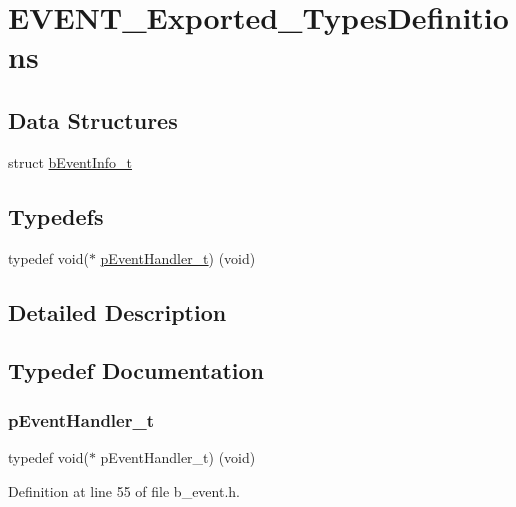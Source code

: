 \hypertarget{group___e_v_e_n_t___exported___types_definitions}{}\section{E\+V\+E\+N\+T\+\_\+\+Exported\+\_\+\+Types\+Definitions}
\label{group___e_v_e_n_t___exported___types_definitions}
\subsection*{Data Structures}
\begin{DoxyCompactItemize}
\item 
struct \mbox{\hyperlink{structb_event_info__t}{b\+Event\+Info\+\_\+t}}
\end{DoxyCompactItemize}
\subsection*{Typedefs}
\begin{DoxyCompactItemize}
\item 
typedef void($\ast$ \mbox{\hyperlink{group___e_v_e_n_t___exported___types_definitions_ga42b0d7ce13d1e439f8fe00eec38e90d1}{p\+Event\+Handler\+\_\+t}}) (void)
\end{DoxyCompactItemize}


\subsection{Detailed Description}


\subsection{Typedef Documentation}
\mbox{\label{group___e_v_e_n_t___exported___types_definitions_ga42b0d7ce13d1e439f8fe00eec38e90d1}} 
\subsubsection{\texorpdfstring{p\+Event\+Handler\+\_\+t}{pEventHandler\_t}}
{\footnotesize\ttfamily typedef void($\ast$ p\+Event\+Handler\+\_\+t) (void)}



Definition at line 55 of file b\+\_\+event.\+h.

